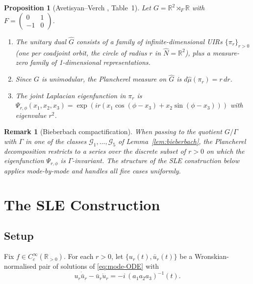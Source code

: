 \documentclass[12pt, a4paper]{article}
\newtheorem{proposition}[theorem]{Proposition}
\newtheorem{remark}[theorem]{Remark}
\theoremstyle{remark}
\newcommand{\bR}{\mathbb{R}}
\newcommand{\semidp}{\rtimes}
\begin{document}
\begin{proposition}[Avetisyan--Verch \cite{AV13}, Table~1]\label{prop:Plancherel}
  Let $G = \bR^2 \semidp_F \bR$ with $F = \begin{pmatrix}0&1\\-1&0\end{pmatrix}$.
  \begin{enumerate}
  \item[(i)] The unitary dual $\hat{G}$ consists of a family of infinite-dimensional
    UIRs $\{\pi_r\}_{r>0}$ (one per coadjoint orbit, the circle of radius $r$
    in $\hat{N} = \bR^2$), plus a measure-zero family of 1-dimensional
    representations.
  \item[(ii)] Since $G$ is unimodular, the Plancherel measure on $\hat{G}$
    is $d\hat\mu(\pi_r) = r\,dr$.
  \item[(iii)] The joint Laplacian eigenfunction in $\pi_r$ is
    $\Psi_{r,\phi}(x_1,x_2,x_3) = \exp(ir(x_1\cos(\phi - x_3) + x_2\sin(\phi - x_3)))$
    with eigenvalue $r^2$.
  \end{enumerate}
\end{proposition}

\begin{remark}[Bieberbach compactification]\label{rem:bieberbach-Plancherel}
  When passing to the quotient $G/\Gamma$ with $\Gamma$ in one of the
  classes $\mathcal{G}_1,\dots,\mathcal{G}_5$ of
  Lemma~\ref{lem:bieberbach}, the Plancherel decomposition restricts to a
  series over the discrete subset of $r > 0$ on which the eigenfunction
  $\Psi_{r,\phi}$ is $\Gamma$-invariant.  The structure of the SLE
  construction below applies mode-by-mode and handles all five cases
  uniformly.
\end{remark}

\section{The SLE Construction}\label{sec:SLE}

\subsection{Setup}

Fix $f \in C_c^\infty(\bR_{>0})$.  For each $r > 0$, let $\{u_r(t),
\bar u_r(t)\}$ be a Wronskian-normalised pair of solutions of
\eqref{eq:mode-ODE} with
\begin{equation}\label{eq:Wronskian}
  u_r \dot{\bar u}_r - \bar u_r \dot u_r = -i\,(a_1 a_2 a_3)^{-1}(t).
\end{equation}
\end{document}
